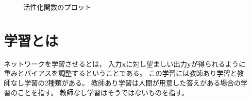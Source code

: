 \documentclass[class=jsarticle, crop=false, dvipdfmx, fleqn]{standalone}
\begin{document}
\begin{figure}
	\centering
	\begin{minipage}{0.45\linewidth}
		\centering
		
		\label{fig:step_function}
	\end{minipage}
	\begin{minipage}{0.45\linewidth}
		\centering
		
		\label{fig:sigmoid_function}
	\end{minipage}
	\begin{minipage}{0.45\linewidth}
		\centering
		
		\label{fig:tanh_function}
	\end{minipage}
	\begin{minipage}{0.45\linewidth}
		\centering
		
		\label{fig:softplus_function}
	\end{minipage}
	\begin{minipage}{0.45\linewidth}
		\centering
		
		\label{fig:relu_function}
	\end{minipage}
	\begin{minipage}{0.45\linewidth}
		\centering
		
		\label{fig:leaky_relu_function}
	\end{minipage}
	\begin{minipage}{0.45\linewidth}
		\centering
		
		\label{fig:elu_function}
	\end{minipage}
	\begin{minipage}{0.45\linewidth}
		\centering
		
		\label{fig:identity_function}
	\end{minipage}
	\caption{活性化関数のプロット}
	\label{fig:plot_of_activate_function}
\end{figure}



\section{学習とは}

ネットワークを学習させるとは，
入力$\bm{x}$に対し望ましい出力$\bm{y}$が得られるように
重みとバイアスを調整するということである。
この学習には教師あり学習と教師なし学習の2種類がある。
教師あり学習は人間が用意した答えがある場合の学習のことを指す。
教師なし学習はそうではないものを指す。
\end{document}
